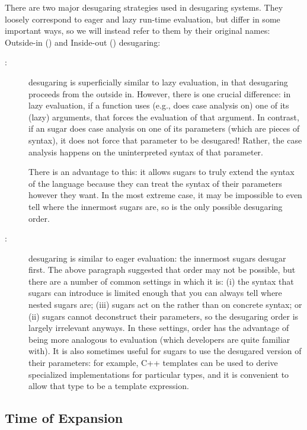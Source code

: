 There are two major desugaring strategies used in desugaring systems.
They loosely correspond to eager and lazy run-time evaluation, but
differ in some important ways, so we will instead refer
to them by their original names: Outside-in () and
Inside-out () desugaring:~\cite{expansion-order}
\begin{description}
\item[:]  desugaring is superficially similar to lazy
  evaluation, in that desugaring proceeds from the outside in.
  However, there is one crucial difference: in lazy evaluation, if a
  function uses (e.g., does case analysis on) one of its (lazy)
  arguments, that forces the evaluation of that argument. In contrast,
  if an  sugar does case analysis on one of its
  parameters (which are pieces of syntax), it does not force that
  parameter to be desugared! Rather, the case analysis happens on the
  uninterpreted syntax of that parameter.

  There is an advantage to this: it allows sugars to truly extend the
  syntax of the language because they can treat the syntax of their
  parameters however they want.
  In the most extreme case, it may be impossible
  to even tell where the innermost sugars are, so  is the only
  possible desugaring order.
\item[:]  desugaring is similar to eager evaluation: the
  innermost sugars desugar first. The above paragraph suggested that
   order may not be possible, but there are a number of common
  settings in which it is: (i) the syntax that sugars can introduce is
  limited enough that you can always tell where nested sugars are;
  (iii) sugars act on the  rather than on concrete syntax; or
  (ii) sugars cannot deconstruct their parameters, so the desugaring
  order is largely irrelevant anyways. In these settings, 
  order has the advantage of being more analogous to evaluation (which
  developers are quite familiar with). It is
  also sometimes useful for sugars to use the desugared version of
  their parameters: for example, C++ templates can be used to derive
  specialized implementations for particular types, and it is
  convenient to allow that type to be a template expression.
\end{description}


\subsection{Time of Expansion}

